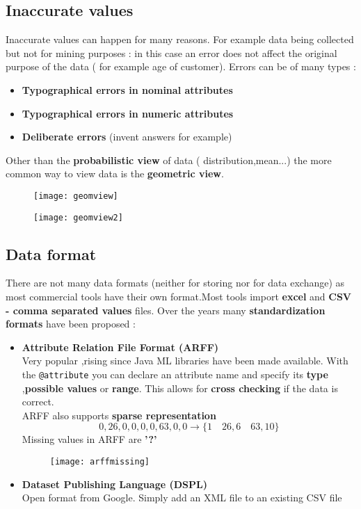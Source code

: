 \subsection{Inaccurate values}
Inaccurate values can happen for many reasons. For example data being collected but not for mining purposes : in this case an error does not affect the original purpose of the data ( for example age of customer). Errors can be of many types :
\begin{itemize}
\item \textbf{Typographical errors in nominal attributes}
\item \textbf{Typographical errors in numeric attributes}
\item \textbf{Deliberate errors} (invent answers for example)
\end{itemize}
Other than the \textbf{probabilistic view} of data ( distribution,mean...) the more common way to view data is the \textbf{geometric view}.
\begin{figure}[H]
  \centering
  \texttt{[image: geomview]}
\end{figure}
\begin{figure}[H]
  \centering
  \texttt{[image: geomview2]}
\end{figure}

\subsection{Data format}
There are not many data formats (neither for storing nor for data exchange) as most commercial tools have their own format.Most tools import \textbf{excel} and \textbf{CSV - comma separated values} files. Over the years many \textbf{standardization formats} have been proposed :
\begin{itemize}
\item \textbf{Attribute Relation File Format (ARFF)}\\
Very popular ,rising since Java ML libraries have been made available. With the \texttt{@attribute} you can declare an attribute name and specify its \textbf{type} ,\textbf{possible values} or \textbf{range}. This allows for \textbf{cross checking} if the data is correct.\\
ARFF also supports \textbf{sparse representation} $$ 0,26,0,0,0,0,63,0,0 \to \{1 \quad 26, 6 \quad 63,10\} $$
Missing values in ARFF are \textbf{'?'}
\begin{figure}[H]
  \centering
  \texttt{[image: arffmissing]}
\end{figure}
\item \textbf{Dataset Publishing Language (DSPL)}\\
Open format from Google. Simply add an XML file to an existing CSV file 
\end{itemize} 

